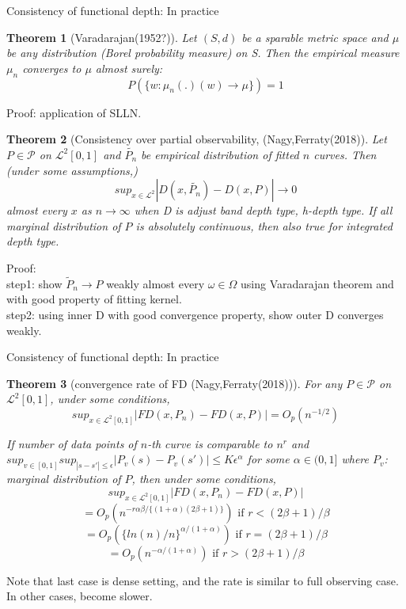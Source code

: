 \documentclass[aspectratio=169,ignorenonframetext,9pt]{beamer}
\theoremstyle{plain}
\newtheorem{thm}{Theorem}[section]
\theoremstyle{definition}
\begin{document}
\begin{frame}{Consistency of functional depth: In practice}
    \begin{thm}[Varadarajan(1952?)]
        Let $(S,d)$ be a sparable metric space and $\mu$ be any distribution (Borel probability measure) on S.
        Then the empirical measure $\mu_n$ converges to $\mu$ almost surely:
        \[P(\{w:\mu_n(.)(w)\rightarrow\mu\})=1\]
    \end{thm}
    Proof: application of SLLN.

    \begin{thm}[Consistency over partial observability, (Nagy,Ferraty(2018)]
        Let $P\in\mathcal{P}$ on $\mathcal{L}^2[0,1]$ and $\tilde{P_n}$ be empirical distribution of fitted $n$ curves.
        Then (under some assumptions,)
        \[sup_{x\in\mathcal{L}^2} |D(x,\tilde{P_n})-D(x,P)|\rightarrow 0\]
        almost every $x$ as $n\rightarrow\infty$ when D is adjust band depth type, h-depth type.
        If all marginal distribution of $P$ is absolutely continuous, then also true for integrated depth type.
    \end{thm}
    Proof:  \\
    step1: show $\tilde{P}_n\rightarrow P$ weakly almost every $\omega\in\Omega$ using Varadarajan theorem and with good property of fitting kernel. \\
    step2: using inner D with good convergence property, show outer D converges weakly.

\end{frame}

\begin{frame}{Consistency of functional depth: In practice}
    \begin{thm}[convergence rate of FD (Nagy,Ferraty(2018))]
        For any $P\in\mathcal{P}$ on $\mathcal{L}^2[0,1]$, under some conditions,
        \[sup_{x\in\mathcal{L}^2[0,1]}|FD(x,P_n)-FD(x,P)|=O_p(n^{-1/2})\]
        
        If number of data points of $n$-th curve is comparable to $n^r$ and 
        \(sup_{v\in[0,1]} sup_{|s-s'|\leq \epsilon} |P_v(s)-P_v(s')|\leq K\epsilon^\alpha\) for some $\alpha\in(0,1]$
        where $P_v$: marginal distribution of $P$,
        then under some conditions,
        \[sup_{x\in\mathcal{L}^2[0,1]}|FD(x,P_n)-FD(x,P)|\]
        \[=O_p(n^{-r\alpha\beta/\{(1+\alpha)(2\beta+1)\}}) \text{ if } r<(2\beta+1)/\beta\]
        \[=O_p(\{ln(n)/n\}^{\alpha/(1+\alpha)}) \text{ if } r=(2\beta+1)/\beta\]
        \[=O_p(n^{-\alpha/(1+\alpha)}) \text{ if } r>(2\beta+1)/\beta\]
    \end{thm}
    Note that last case is dense setting, and the rate is similar to full observing case.
    In other cases, become slower.

\end{frame}
\end{document}
